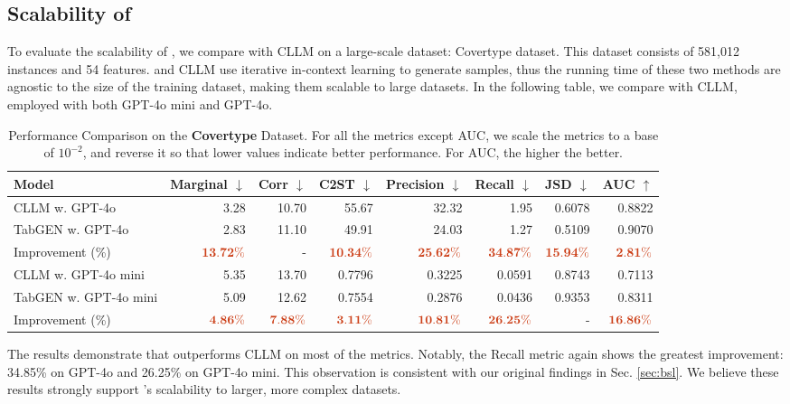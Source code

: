 \subsection{Scalability of \modelname}
To evaluate the scalability of \modelname, we compare \modelname with CLLM on a large-scale dataset: Covertype dataset. This dataset consists of 581,012 instances and 54 features. \modelname and CLLM use iterative in-context learning to generate samples, thus the running time of these two methods are agnostic to the size of the training dataset, making them scalable to large datasets. In the following table, we compare \modelname with CLLM, employed with both GPT-4o mini and GPT-4o. 
\begin{table}[!t]
\begin{center}
\caption{Performance Comparison on the \textbf{Covertype} Dataset. For all the metrics except AUC, we scale the metrics to a base of 
$10^{-2}$, and reverse it so that lower values indicate better performance. For AUC, the higher the better.}
\begin{tabular}{lrrrrrrr}
\hline
Model & Marginal $\downarrow$ & Corr $\downarrow$ & C2ST $\downarrow$ & Precision $\downarrow$ & Recall $\downarrow$ & JSD $\downarrow$ & AUC $\uparrow$ \\
\hline
\hline
CLLM w. GPT-4o & 3.28 & 10.70 & 55.67 & 32.32 & 1.95 & 0.6078 & 0.8822 \\
TabGEN w. GPT-4o & 2.83 & 11.10 & 49.91 & 24.03 & 1.27 & 0.5109 & 0.9070 \\
Improvement (\%) & $\redbf{13.72\%}$ & - & $\redbf{10.34\%}$ & $\redbf{25.62\%}$ & $\redbf{34.87\%}$ & $\redbf{15.94\%}$ & $\redbf{2.81\%}$ \\
\hline
\hline
CLLM w. GPT-4o mini & 5.35 & 13.70 & 0.7796 & 0.3225 & 0.0591 & 0.8743 & 0.7113 \\
TabGEN w. GPT-4o mini & 5.09 & 12.62 & 0.7554 & 0.2876 & 0.0436 & 0.9353 & 0.8311 \\
Improvement (\%) & $\redbf{4.86\%}$ & $\redbf{7.88\%}$ & $\redbf{3.11\%}$ & $\redbf{10.81\%}$ & $\redbf{26.25\%}$ & - & $\redbf{16.86\%}$ \\
\hline
\end{tabular}
\end{center}
\end{table}

The results demonstrate that \modelname outperforms CLLM on most of the metrics. Notably, the Recall metric again shows the greatest improvement: 34.85\% on GPT-4o and 26.25\% on GPT-4o mini. This observation is consistent with our original findings in Sec. \ref{sec:bsl}. We believe these results strongly support \modelname's scalability to larger, more complex datasets.

